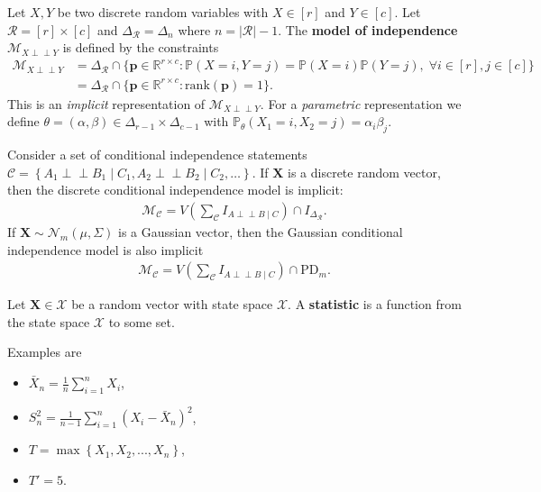 \documentclass[a4paper, 11pt]{article}
\newcommand{\indep}{\perp \!\!\! \perp}
\begin{document}
\begin{eg}
  Let \( X,Y \) be two discrete random variables with \( X \in [r] \) and \( Y \in [c] \). Let \( \mathcal{R} = [r] \times [c] \) and \( \Delta_{\mathcal{R}} = \Delta_{n} \) where \( n = |\mathcal{R}| - 1 \). The \textbf{model of independence} \( \mathcal{M}_{X \indep Y} \) is defined by the constraints
  \begin{align*}
    \mathcal{M}_{X \indep Y} &= \Delta_{\mathcal{R}} \cap \{ \mathbf p \in \mathbb R^{r \times c} : \mathbb P(X = i, Y = j) = \mathbb P(X = i) \mathbb P(Y = j), \; \forall i \in [r], j \in [c]\} \\
    &=  \Delta_{\mathcal{R}} \cap \{ \mathbf p \in \mathbb R^{r \times c} : \mathrm{rank}(\mathbf p) = 1\}.
  \end{align*}
  This is an \emph{implicit} representation of \( \mathcal{M}_{X \indep Y} \). For a \emph{parametric} representation we define \( \theta = (\alpha, \beta) \in \Delta_{r - 1} \times \Delta_{c - 1} \) with \( \mathbb P_{\theta}(X_1 = i, X_2 = j) = \alpha_{i} \beta_{j} \).
\end{eg}

\begin{eg}
  Consider a set of conditional independence statements \( \mathcal{C}  = \left\{ A_1 \indep B_1 \mid C_1, A_2 \indep B_2 \mid C_2, \dots \right\}\). If \( \mathbf X \) is a discrete random vector, then the discrete conditional independence model is implicit:
  \begin{align*}
    \mathcal{M}_{\mathcal{C}} = V\left(\sum_{\mathcal{C}} I_{A \indep B \mid C}\right) \cap I_{\Delta_{\mathcal{R}}}.
  \end{align*}
  If \( \mathbf X \sim \mathcal{N}_m(\mu, \Sigma) \) is a Gaussian vector, then the Gaussian conditional independence model is also implicit
  \begin{align*}
    \mathcal{M}_{\mathcal{C}} = V\left(\sum_{\mathcal{C}} I_{A \indep B \mid C}\right) \cap \mathrm{PD}_{m}.
  \end{align*}
\end{eg}

\begin{defi}[Statistic]
  Let \( \mathbf X \in \mathcal{X} \) be a random vector with state space \( \mathcal{X} \).
  A \textbf{statistic} is a function from the state space \( \mathcal{X} \) to some set.
\end{defi}

Examples are 
\begin{itemize}
  \item \( \bar X_n = \frac{1}{n} \sum^n_{i=1}X_i \),
  \item \( S^2_n = \frac{1}{n-1} \sum^n_{i=1} (X_i - \bar X_n)^2 \),
  \item \( T = \max\left\{ X_1,X_2, ..., X_n \right\} \),
  \item \( T' = 5 \).
\end{itemize}
\end{document}
